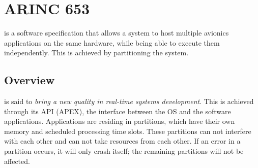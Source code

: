\section{ARINC 653}
\label{anal:arinc}
\arinc{} is a software specification that allows a system to host
multiple avionics applications on the same hardware, while being able
to execute them independently. This is achieved by partitioning the
system\cite{arinc_page_2}.

\subsection{Overview}
\label{anal:arinc_overview}
\arinc{} is said to \textit{bring a new quality in real-time systems
development}\cite{arinc_scarlett}.
This is achieved through its API (APEX), the interface between
the OS and the software applications.
Applications are residing in partitions,
which have their own memory and scheduled processing time slots.
These partitions can not interfere with each other and can
not take resources from each other.
If an error in a partition occurs, it will only crash itself;
the remaining partitions will not be affected.

